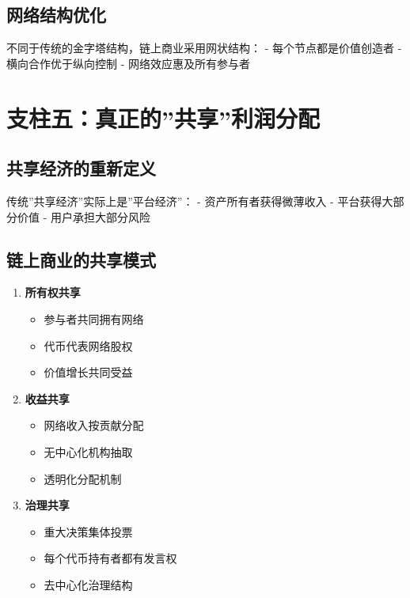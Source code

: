 \documentclass[
  Letterpaper,
]{scrbook}
\providecommand{\tightlist}{%
  \setlength{\itemsep}{0pt}\setlength{\parskip}{0pt}}
\begin{document}
\subsection{网络结构优化}\label{ux7f51ux7edcux7ed3ux6784ux4f18ux5316}

不同于传统的金字塔结构，链上商业采用网状结构： - 每个节点都是价值创造者
- 横向合作优于纵向控制 - 网络效应惠及所有参与者

\section{支柱五：真正的''共享''利润分配}\label{ux652fux67f1ux4e94ux771fux6b63ux7684ux5171ux4eabux5229ux6da6ux5206ux914d}

\subsection{共享经济的重新定义}\label{ux5171ux4eabux7ecfux6d4eux7684ux91cdux65b0ux5b9aux4e49}

传统''共享经济''实际上是''平台经济''： - 资产所有者获得微薄收入 -
平台获得大部分价值 - 用户承担大部分风险

\subsection{链上商业的共享模式}\label{ux94feux4e0aux5546ux4e1aux7684ux5171ux4eabux6a21ux5f0f}

\begin{enumerate}
\def\labelenumi{\arabic{enumi}.}
\tightlist
\item
  \textbf{所有权共享}

  \begin{itemize}
  \tightlist
  \item
    参与者共同拥有网络
  \item
    代币代表网络股权
  \item
    价值增长共同受益
  \end{itemize}
\item
  \textbf{收益共享}

  \begin{itemize}
  \tightlist
  \item
    网络收入按贡献分配
  \item
    无中心化机构抽取
  \item
    透明化分配机制
  \end{itemize}
\item
  \textbf{治理共享}

  \begin{itemize}
  \tightlist
  \item
    重大决策集体投票
  \item
    每个代币持有者都有发言权
  \item
    去中心化治理结构
  \end{itemize}
\end{enumerate}
\end{document}
